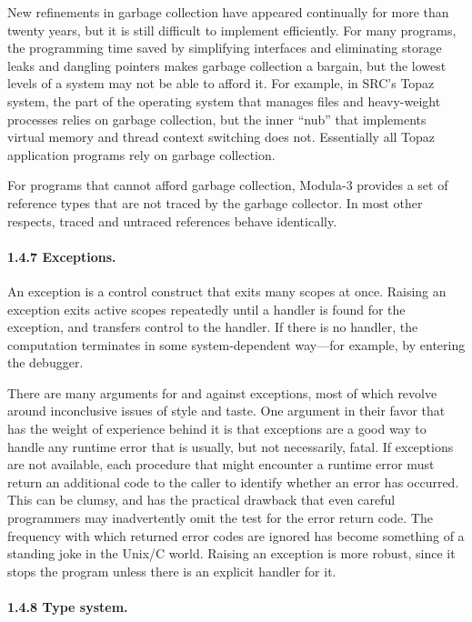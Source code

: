\documentclass[10pt]{article}
\begin{document}
New refinements in garbage collection have appeared continually for more than
twenty years, but it is still difficult to implement efficiently.  For many
programs, the programming time saved by simplifying interfaces and eliminating
storage leaks and dangling pointers makes garbage collection a bargain, but
the lowest levels of a system may not be able to afford it.  For example, in
SRC's Topaz system, the part of the operating system that manages files and
heavy-weight processes relies on garbage collection, but the inner ``nub''
that implements virtual memory and thread context switching does not.
Essentially all Topaz application programs rely on garbage collection.

For programs that cannot afford garbage collection, Modula-3 provides a set of
reference types that are not traced by the garbage collector.  In most other
respects, traced and untraced references behave identically.

\paragraph{1.4.7 Exceptions.}

An exception is a control construct that exits many scopes at once.  Raising
an exception exits active scopes repeatedly until a handler is found for the
exception, and transfers control to the handler.  If there is no handler, the
computation terminates in some system-dependent way---for example, by entering
the debugger.

There are many arguments for and against exceptions, most of which revolve
around inconclusive issues of style and taste.  One argument in their favor
that has the weight of experience behind it is that exceptions are a good way
to handle any runtime error that is usually, but not necessarily, fatal.  If
exceptions are not available, each procedure that might encounter a runtime
error must return an additional code to the caller to identify whether an
error has occurred.  This can be clumsy, and has the practical drawback that
even careful programmers may inadvertently omit the test for the error return
code.  The frequency with which returned error codes are ignored has become
something of a standing joke in the Unix/C world.  Raising an exception is
more robust, since it stops the program unless there is an explicit handler
for it.

\paragraph{1.4.8 Type system.}
\end{document}
